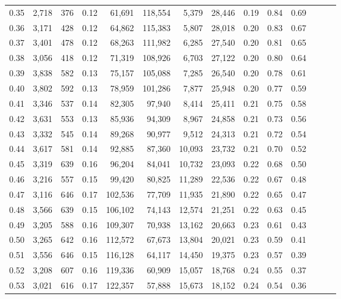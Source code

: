 \begin{tabular}{rrrrrrrrrrrrrr}
0.35 &  2,718 &  376 &  0.12 &   61,691 &  118,554 &   5,379 &  28,446 &  0.19 &  0.84 &      0.69 \\
0.36 &  3,171 &  428 &  0.12 &   64,862 &  115,383 &   5,807 &  28,018 &  0.20 &  0.83 &      0.67 \\
0.37 &  3,401 &  478 &  0.12 &   68,263 &  111,982 &   6,285 &  27,540 &  0.20 &  0.81 &      0.65 \\
0.38 &  3,056 &  418 &  0.12 &   71,319 &  108,926 &   6,703 &  27,122 &  0.20 &  0.80 &      0.64 \\
0.39 &  3,838 &  582 &  0.13 &   75,157 &  105,088 &   7,285 &  26,540 &  0.20 &  0.78 &      0.61 \\
0.40 &  3,802 &  592 &  0.13 &   78,959 &  101,286 &   7,877 &  25,948 &  0.20 &  0.77 &      0.59 \\
0.41 &  3,346 &  537 &  0.14 &   82,305 &   97,940 &   8,414 &  25,411 &  0.21 &  0.75 &      0.58 \\
0.42 &  3,631 &  553 &  0.13 &   85,936 &   94,309 &   8,967 &  24,858 &  0.21 &  0.73 &      0.56 \\
0.43 &  3,332 &  545 &  0.14 &   89,268 &   90,977 &   9,512 &  24,313 &  0.21 &  0.72 &      0.54 \\
0.44 &  3,617 &  581 &  0.14 &   92,885 &   87,360 &  10,093 &  23,732 &  0.21 &  0.70 &      0.52 \\
0.45 &  3,319 &  639 &  0.16 &   96,204 &   84,041 &  10,732 &  23,093 &  0.22 &  0.68 &      0.50 \\
0.46 &  3,216 &  557 &  0.15 &   99,420 &   80,825 &  11,289 &  22,536 &  0.22 &  0.67 &      0.48 \\
0.47 &  3,116 &  646 &  0.17 &  102,536 &   77,709 &  11,935 &  21,890 &  0.22 &  0.65 &      0.47 \\
0.48 &  3,566 &  639 &  0.15 &  106,102 &   74,143 &  12,574 &  21,251 &  0.22 &  0.63 &      0.45 \\
0.49 &  3,205 &  588 &  0.16 &  109,307 &   70,938 &  13,162 &  20,663 &  0.23 &  0.61 &      0.43 \\
0.50 &  3,265 &  642 &  0.16 &  112,572 &   67,673 &  13,804 &  20,021 &  0.23 &  0.59 &      0.41 \\
0.51 &  3,556 &  646 &  0.15 &  116,128 &   64,117 &  14,450 &  19,375 &  0.23 &  0.57 &      0.39 \\
0.52 &  3,208 &  607 &  0.16 &  119,336 &   60,909 &  15,057 &  18,768 &  0.24 &  0.55 &      0.37 \\
0.53 &  3,021 &  616 &  0.17 &  122,357 &   57,888 &  15,673 &  18,152 &  0.24 &  0.54 &      0.36 \\

\end{tabular}
